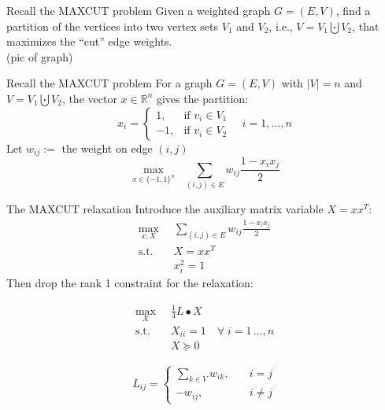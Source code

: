 \documentclass{beamer}
\begin{document}
\begin{frame}{Recall the MAXCUT problem}
Given a weighted graph $G = (E, V)$, find a partition of the vertices into two vertex sets $V_1$ and $V_2$, i.e., $V = V_1\bigcupdot V_2$, that maximizes the ``cut'' edge weights.\\
\vspace{2cm}
(pic of graph)
\end{frame}

\begin{frame}{Recall the MAXCUT problem}
For a graph $G = (E,V)$ with $|V| = n$ and $V = V_1 \bigcupdot V_2$, the vector $x \in \mathbb{R}^n$ gives the partition:
$$
x_i = \begin{cases} 1, & \text{if } v_i \in V_1 \\
-1 , & \text{if } v_i \in V_2
\end{cases} \quad i = 1, \dots, n
$$
Let $w_{ij} := $ the weight on edge $(i,j)$
$$
\max_{x \in \{-1,1\}^n}\;\;  \sum_{(i,j) \in E} w_{ij}\frac{1-x_ix_j}{2}
$$
\end{frame}

\begin{frame}{The MAXCUT relaxation}
Introduce the auxiliary matrix variable $X = xx^T$:
\begin{align*}
\max_{x,X} \;\;  & \sum_{(i,j) \in E} w_{ij}\frac{1-x_ix_j}{2} \\
\text{s.t.} \;\; & X = xx^T \\
 & x_i^2 = 1
\end{align*}
Then drop the rank 1 constraint for the relaxation:

\begin{minipage}{0.6\linewidth}


\begin{align*}
\max_{X} \;\;  & \frac{1}{4} L \bullet X \\
\text{s.t.} \;\; & X_{ii} = 1 \quad \forall \; i=1\,\ldots,n\\
 & X \succcurlyeq 0
\end{align*}

\end{minipage}
\begin{minipage}{0.3\linewidth}

$$
L_{ij} = \left\{ \begin{aligned}
\sum _{k\in V} w_{ik},  \quad & i = j \\
-w_{ij}, \quad & i \neq j
\end{aligned}\right.
$$

\end{minipage}
\end{frame}
\end{document}
